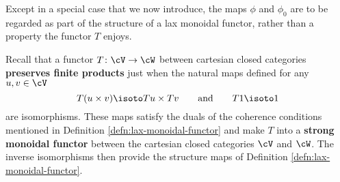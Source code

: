 
Except in a special case that we now introduce, the maps $\phi$ and $\phi_0$ are to be regarded as part of the structure of a lax monoidal functor, rather than a property the functor $T$ enjoys.

Recall that a functor $T \colon \cV \to \cW$ between cartesian closed categories \textbf{preserves finite products} just when the natural maps defined for any $u,v \in \cV$
\[ T(u \times v) \isoto Tu \times Tv \qquad \text{and} \qquad T1 \isoto 1\]
are isomorphisms. These maps satisfy the duals of the coherence conditions mentioned in Definition \ref{defn:lax-monoidal-functor} and  make $T$ into a \textbf{strong monoidal functor} between the cartesian closed categories $\cV$ and $\cW$. The inverse isomorphisms then provide the structure maps of Definition \ref{defn:lax-monoidal-functor}. %

